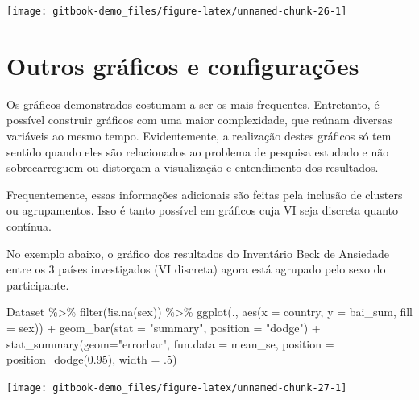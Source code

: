 \documentclass[
]{book}
\newenvironment{Shaded}{\begin{snugshade}}{\end{snugshade}}
\newcommand{\AttributeTok}[1]{\textcolor[rgb]{0.77,0.63,0.00}{#1}}
\newcommand{\DecValTok}[1]{\textcolor[rgb]{0.00,0.00,0.81}{#1}}
\newcommand{\FloatTok}[1]{\textcolor[rgb]{0.00,0.00,0.81}{#1}}
\newcommand{\FunctionTok}[1]{\textcolor[rgb]{0.00,0.00,0.00}{#1}}
\newcommand{\NormalTok}[1]{#1}
\newcommand{\SpecialCharTok}[1]{\textcolor[rgb]{0.00,0.00,0.00}{#1}}
\newcommand{\StringTok}[1]{\textcolor[rgb]{0.31,0.60,0.02}{#1}}
\begin{document}
\begin{center}\texttt{[image: gitbook-demo\_files/figure-latex/unnamed-chunk-26-1]} \end{center}

\hypertarget{outros-gruxe1ficos-e-configurauxe7uxf5es}{%
\section{Outros gráficos e configurações}\label{outros-gruxe1ficos-e-configurauxe7uxf5es}}

Os gráficos demonstrados costumam a ser os mais frequentes. Entretanto, é possível construir gráficos com uma maior complexidade, que reúnam diversas variáveis ao mesmo tempo. Evidentemente, a realização destes gráficos só tem sentido quando eles são relacionados ao problema de pesquisa estudado e não sobrecarreguem ou distorçam a visualização e entendimento dos resultados.

Frequentemente, essas informações adicionais são feitas pela inclusão de clusters ou agrupamentos. Isso é tanto possível em gráficos cuja VI seja discreta quanto contínua.

No exemplo abaixo, o gráfico dos resultados do Inventário Beck de Ansiedade entre os 3 países investigados (VI discreta) agora está agrupado pelo sexo do participante.

\begin{Shaded}
\begin{Highlighting}[]
\NormalTok{Dataset }\SpecialCharTok{\%\textgreater{}\%} 
  \FunctionTok{filter}\NormalTok{(}\SpecialCharTok{!}\FunctionTok{is.na}\NormalTok{(sex)) }\SpecialCharTok{\%\textgreater{}\%} 
  \FunctionTok{ggplot}\NormalTok{(., }\FunctionTok{aes}\NormalTok{(}\AttributeTok{x =}\NormalTok{ country, }\AttributeTok{y =}\NormalTok{ bai\_sum, }\AttributeTok{fill =}\NormalTok{ sex)) }\SpecialCharTok{+}
  \FunctionTok{geom\_bar}\NormalTok{(}\AttributeTok{stat =} \StringTok{"summary"}\NormalTok{, }\AttributeTok{position =} \StringTok{"dodge"}\NormalTok{) }\SpecialCharTok{+}
  \FunctionTok{stat\_summary}\NormalTok{(}\AttributeTok{geom=}\StringTok{"errorbar"}\NormalTok{, }\AttributeTok{fun.data =}\NormalTok{ mean\_se, }
               \AttributeTok{position =} \FunctionTok{position\_dodge}\NormalTok{(}\FloatTok{0.95}\NormalTok{), }\AttributeTok{width =}\NormalTok{ .}\DecValTok{5}\NormalTok{) }
\end{Highlighting}
\end{Shaded}

\begin{center}\texttt{[image: gitbook-demo\_files/figure-latex/unnamed-chunk-27-1]} \end{center}
\end{document}
